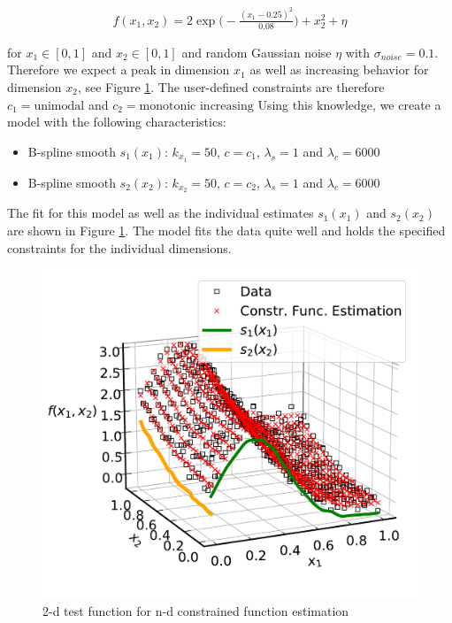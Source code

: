 \documentclass[10pt,a4paper]{report}
\begin{document}
\begin{align} \label{eq:2d_test_func}
	f(x_1, x_2) = 2\exp{\Big(-\frac{(x_1 - 0.25)^2}{0.08}\Big)} + x_2^2 + \eta
\end{align}

for $x_1 \in [0,1]$ and $x_2 \in [0,1]$ and random Gaussian noise $\eta$ with $\sigma_{noise} = 0.1$. Therefore we expect a peak in dimension $x_1$ as well as increasing behavior for dimension $x_2$, see Figure \ref{fig:2d_example}. The user-defined constraints are therefore $c_1 = \text{unimodal}$ and $c_2 = \text{monotonic increasing}$ Using this knowledge, we create a model with the following characteristics:

\begin{itemize}
	\item B-spline smooth $s_1(x_1)$: $k_{x_1} = 50$, $c = c_1$, $\lambda_s = 1$ and $\lambda_c = 6000$
	\item B-spline smooth $s_2(x_2)$: $k_{x_2} = 50$, $c = c_2$, $\lambda_s = 1$ and $\lambda_c = 6000$
\end{itemize}

The fit for this model as well as the individual estimates $s_1(x_1)$ and $s_2(x_2)$ are shown in Figure \ref{fig:2d_example}. The model fits the data quite well and holds the specified constraints for the individual dimensions.

\begin{figure}[H]
	\centering
	\includegraphics[width=\linewidth]{../thesisplots/2d_example.pdf}
	\caption{2-d test function for n-d constrained function estimation}
	\label{fig:2d_example}
\end{figure}



\printbibliography
\end{document}

